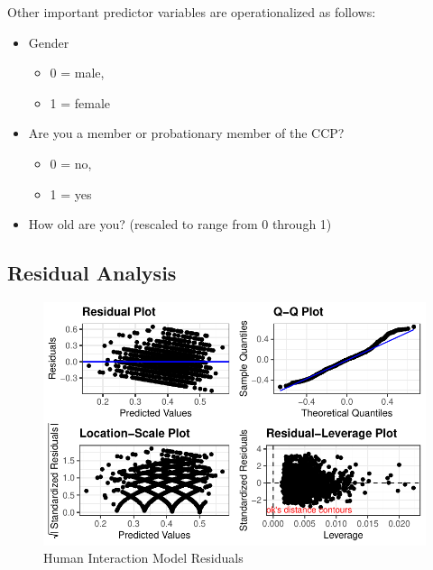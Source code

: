 \documentclass[]{interact}
\theoremstyle{plain}%
\theoremstyle{definition}
\theoremstyle{remark}
\begin{document}
Other important predictor variables are operationalized as follows:

\begin{itemize}
\item
  Gender

  \begin{itemize}
  \item
    0 = male,
  \item
    1 = female
  \end{itemize}
\item
  Are you a member or probationary member of the CCP?

  \begin{itemize}
  \item
    0 = no,
  \item
    1 = yes
  \end{itemize}
\item
  How old are you? (rescaled to range from 0 through 1)
\end{itemize}

\newpage{}

\hypertarget{residual-analysis}{%
\subsection{Residual Analysis}\label{residual-analysis}}

\begin{figure}

{\centering \includegraphics{Social-Isolation-in-China_files/figure-pdf/fig-resids-human-1.pdf}

}

\caption{\label{fig-resids-human}Human Interaction Model Residuals}

\end{figure}
\end{document}

